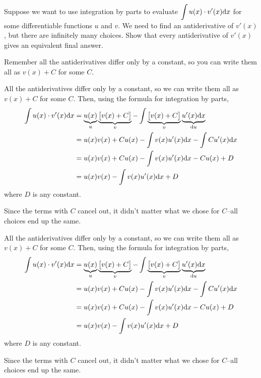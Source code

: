
\begin{Mquestion}
Suppose we want to use integration by parts to evaluate $\displaystyle\int u(x)\cdot v'(x) \mathrm{d}x$ for some differentiable functions $u$ and $v$. We need to find an antiderivative of $v'(x)$, but there are infinitely many choices. Show that every antiderivative of $v'(x)$ gives an equivalent final answer.
\end{Mquestion}
\begin{hint}
Remember all the antiderivatives differ only by a constant, so you can write them all as $v(x)+C$ for some $C$.
\end{hint}
\begin{answer}
All the antiderivatives differ only by a constant, so we can write them all as $v(x)+C$ for some $C$. Then, using the formula for integration by parts,
\begin{align*}
\int u(x)\cdot v'(x) \mathrm{d}x&=\underbrace{u(x)}_u\underbrace{\big[ v(x)+C\big]}_v - \int \underbrace{\big[ v(x)+C\big]}_v \underbrace{u'(x)\mathrm{d}x}_{\mathrm{d}u}\\
&=u(x)v(x)+Cu(x) - \int v(x)u'(x)\mathrm{d}x - \int Cu'(x)\mathrm{d}x
\\&=u(x)v(x)+Cu(x) - \int v(x)u'(x)\mathrm{d}x - Cu(x)+D
\\&=u(x)v(x) - \int v(x)u'(x)\mathrm{d}x +D
\end{align*}
where $D$ is any constant.

Since the terms with $C$ cancel out, it didn't matter what we chose for $C$--all choices end up the same.
\end{answer}
\begin{solution}
All the antiderivatives differ only by a constant, so we can write them all as $v(x)+C$ for some $C$. Then, using the formula for integration by parts,
\begin{align*}
\int u(x)\cdot v'(x) \mathrm{d}x&=\underbrace{u(x)}_u\underbrace{\big[ v(x)+C\big]}_v - \int \underbrace{\big[ v(x)+C\big]}_v \underbrace{u'(x)\mathrm{d}x}_{\mathrm{d}u}\\
&=u(x)v(x)+Cu(x) - \int v(x)u'(x)\mathrm{d}x - \int Cu'(x)\mathrm{d}x
\\&=u(x)v(x)+Cu(x) - \int v(x)u'(x)\mathrm{d}x - Cu(x)+D
\\&=u(x)v(x) - \int v(x)u'(x)\mathrm{d}x +D
\end{align*}
where $D$ is any constant.

Since the terms with $C$ cancel out, it didn't matter what we chose for $C$--all choices end up the same.
\end{solution}


